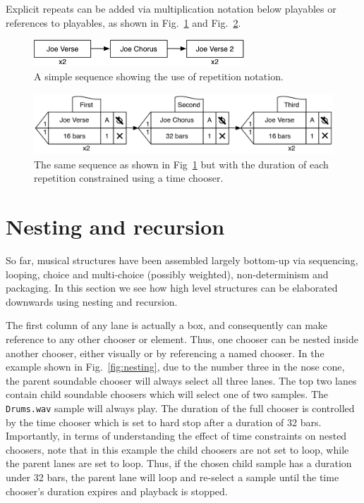 \documentclass[runningheads,a4paper]{llncs}
\begin{document}
Explicit repeats can be added via multiplication notation below playables or references to playables, as shown in Fig.~\ref{fig:repetition} and Fig.~\ref{fig:repetition-durations}.

\begin{figure}
	\centering
	\includegraphics[height=1cm]{images/repetition.png}
	\caption{A simple sequence showing the use of repetition notation.}\label{fig:repetition}
\end{figure}



\begin{figure}
	\centering
	\includegraphics[height=2.3cm]{images/repetition-durations.png}
	\caption{The same sequence as shown in Fig~\ref{fig:repetition} but with the duration of each repetition constrained using a time chooser.}\label{fig:repetition-durations}
\end{figure}



\section{Nesting and recursion}\label{nesting-and-recursion}

So far, musical structures have been assembled largely bottom-up via sequencing, looping, choice and multi-choice (possibly weighted), non-determinism and packaging. In this section we see how high level structures can be elaborated downwards using nesting and recursion.
 
The first column of any lane is actually a box, and consequently can make reference to any other chooser or element. Thus, one chooser can be nested inside another chooser, either visually or by referencing a named chooser. In the example shown in Fig.~\ref{fig:nesting}, due to the number three in the nose cone, the parent soundable chooser will always select all three lanes. The top two lanes contain child soundable choosers which will select one of two samples. The \texttt{Drums.wav} sample will always play. The duration of the full chooser is controlled by the time chooser which is set to hard stop after a duration of 32 bars. Importantly, in terms of understanding the effect of time constraints on nested choosers, note that in this example the child choosers are not set to loop, while the parent lanes are set to loop. Thus, if the chosen child sample has a duration under 32 bars, the parent lane will loop and re-select a sample until the time chooser's duration expires and playback is stopped.
\end{document}
